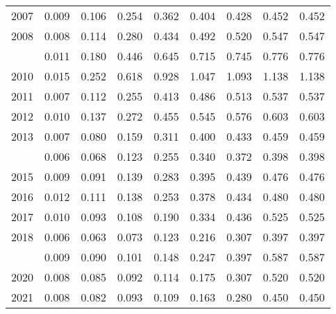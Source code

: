 \documentclass[
]{article}
\begin{document}
\begin{longtable}[t]{lrrrrrrrr}
2007 & 0.009 & 0.106 & 0.254 & 0.362 & 0.404 & 0.428 & 0.452 & 0.452\\
2008 & 0.008 & 0.114 & 0.280 & 0.434 & 0.492 & 0.520 & 0.547 & 0.547\\
\addlinespace
2009 & 0.011 & 0.180 & 0.446 & 0.645 & 0.715 & 0.745 & 0.776 & 0.776\\
2010 & 0.015 & 0.252 & 0.618 & 0.928 & 1.047 & 1.093 & 1.138 & 1.138\\
2011 & 0.007 & 0.112 & 0.255 & 0.413 & 0.486 & 0.513 & 0.537 & 0.537\\
2012 & 0.010 & 0.137 & 0.272 & 0.455 & 0.545 & 0.576 & 0.603 & 0.603\\
2013 & 0.007 & 0.080 & 0.159 & 0.311 & 0.400 & 0.433 & 0.459 & 0.459\\
\addlinespace
2014 & 0.006 & 0.068 & 0.123 & 0.255 & 0.340 & 0.372 & 0.398 & 0.398\\
2015 & 0.009 & 0.091 & 0.139 & 0.283 & 0.395 & 0.439 & 0.476 & 0.476\\
2016 & 0.012 & 0.111 & 0.138 & 0.253 & 0.378 & 0.434 & 0.480 & 0.480\\
2017 & 0.010 & 0.093 & 0.108 & 0.190 & 0.334 & 0.436 & 0.525 & 0.525\\
2018 & 0.006 & 0.063 & 0.073 & 0.123 & 0.216 & 0.307 & 0.397 & 0.397\\
\addlinespace
2019 & 0.009 & 0.090 & 0.101 & 0.148 & 0.247 & 0.397 & 0.587 & 0.587\\
2020 & 0.008 & 0.085 & 0.092 & 0.114 & 0.175 & 0.307 & 0.520 & 0.520\\
2021 & 0.008 & 0.082 & 0.093 & 0.109 & 0.163 & 0.280 & 0.450 & 0.450\\*
\end{longtable}
\end{document}
